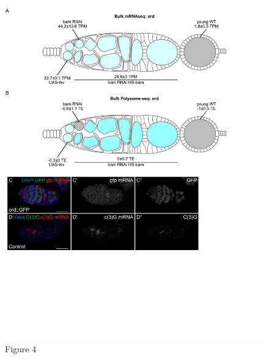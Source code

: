 \documentclass[
]{article}
\begin{document}
\begin{figure}
\centering
\includegraphics{Figure4.pdf}
\caption{Figure 4}
\end{figure}
\end{document}
